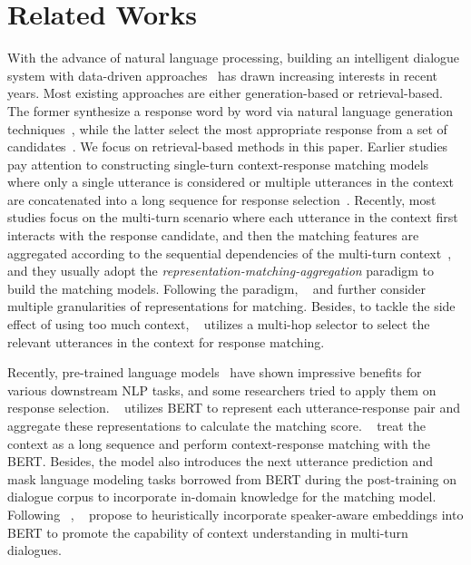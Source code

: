 \documentclass{article}
\begin{document}
\section{Related Works}
With the advance of natural language processing, building an intelligent dialogue system with data-driven approaches~\cite{vinyals2015neural,lowe-etal-2015-ubuntu} has drawn increasing interests in recent years.
Most existing approaches are either generation-based or retrieval-based.
The former synthesize a response word by word via natural language generation techniques~\cite{vinyals2015neural,serban2016building},
while the latter
select the most appropriate response from a set of candidates~\cite{wang-etal-2013-dataset,wu-etal-2017-sequential,whang2020domain}.
We focus on retrieval-based methods in this paper.
Earlier studies pay attention to constructing single-turn context-response matching models where only a single utterance is considered or multiple utterances in the context are concatenated into a long sequence for response selection~\cite{wang-etal-2013-dataset,hu2014convolutional,lowe-etal-2015-ubuntu}.
Recently, most studies focus on the multi-turn scenario where each utterance in the context first interacts with the response candidate, and then the matching features are aggregated according to the sequential dependencies of the multi-turn context~\cite{zhou-etal-2016-multi,wu-etal-2017-sequential,yan2016learning,zhou2018multi,tao-etal-2019-one}, and they usually adopt the \emph{representation-matching-aggregation} paradigm to build the matching models. 
Following the paradigm, ~\citet{tao2019multi} and \citet{wang2019multi} further consider multiple granularities of representations for matching. Besides, to tackle the side effect of using too much context, ~\citet{yuan-etal-2019-multi} utilizes a multi-hop selector to select the relevant utterances in the context for response matching.

Recently, pre-trained language models~\cite{devlin-etal-2019-bert,yang2019xlnet,liu2019roberta} have shown impressive benefits for various downstream NLP tasks, and some researchers tried to apply them on response selection. 
~\citet{vig2019comparison} utilizes BERT to represent each utterance-response pair and aggregate these representations to calculate the matching score.
~\citet{whang2020domain} treat the context as a long sequence and perform context-response matching with the BERT. Besides, the model also introduces the next utterance prediction and mask language modeling tasks borrowed from BERT during the post-training on dialogue
corpus to incorporate in-domain knowledge for the matching model.
Following ~\citet{whang2020domain}, ~\citet{gu2020speaker} propose to heuristically incorporate speaker-aware embeddings into BERT to promote the capability of context understanding in multi-turn dialogues.
\end{document}
